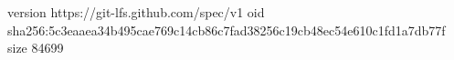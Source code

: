 version https://git-lfs.github.com/spec/v1
oid sha256:5c3eaaea34b495cae769c14cb86c7fad38256c19cb48ec54e610c1fd1a7db77f
size 84699
